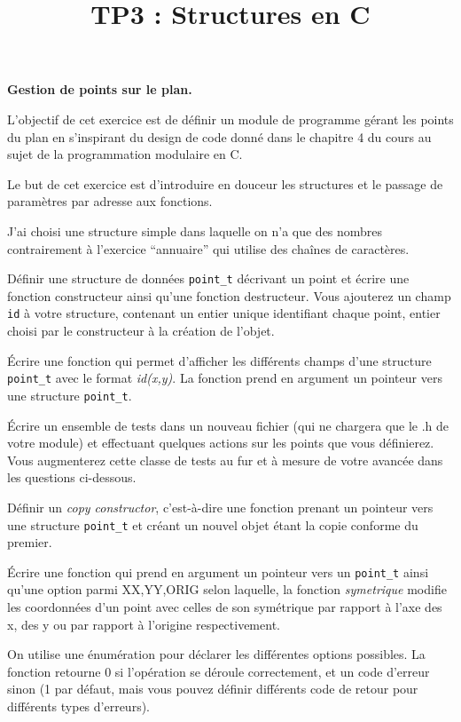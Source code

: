 \documentclass[10pt]{article}\usepackage[correction,nu]{esial}
\title{TP3 : Structures en C}
\begin{document}
\maketitle

\Exercice \textbf{Gestion de points sur le plan.}

L'objectif de cet exercice est de définir un module de programme
gérant les points du plan en s'inspirant du design de code donné dans
le chapitre 4 du cours au sujet de la programmation modulaire en C.
 
\begin{Reponse}
Le but de cet exercice est d'introduire en douceur les structures et
le passage de paramètres par adresse aux fonctions.

J'ai choisi une structure simple dans laquelle on n'a que des nombres
contrairement à l'exercice ``annuaire'' qui utilise des chaînes de
caractères.
\end{Reponse}

\Question Définir une structure de données \texttt{point\_t} décrivant
un point et écrire une fonction constructeur ainsi qu'une fonction
destructeur. Vous ajouterez un champ \texttt{id} à votre structure,
contenant un entier unique identifiant chaque point, entier choisi par
le constructeur à la création de l'objet.

\Question Écrire une fonction qui permet d'afficher les différents
champs d'une structure \texttt{point\_t} avec le format {\em
  id(x,y)}. La fonction prend en argument un pointeur vers une
structure \texttt{point\_t}.

\Question Écrire un ensemble de tests dans un nouveau fichier (qui ne
chargera que le .h de votre module) et effectuant quelques actions sur
les points que vous définierez. Vous augmenterez cette classe de tests
au fur et à mesure de votre avancée dans les questions ci-dessous.

\Question Définir un \textit{copy constructor}, c'est-à-dire une
fonction prenant un pointeur vers une structure \texttt{point\_t} et
créant un nouvel objet étant la copie conforme du premier.

\begin{Question} Écrire une fonction 
  qui prend en argument un pointeur vers un \texttt{point\_t} ainsi
  qu'une option parmi {XX,YY,ORIG} selon laquelle, la fonction {\em
    symetrique} modifie les coordonnées d'un point avec celles de son
  symétrique par rapport à l'axe des x, des y ou par rapport à
  l'origine respectivement.

  On utilise une énumération pour déclarer les différentes options
  possibles. La fonction retourne 0 si l'opération se déroule
  correctement, et un code d'erreur sinon (1 par défaut, mais vous
  pouvez définir différents code de retour pour différents types
  d'erreurs).
\end{Question}
\end{document}
